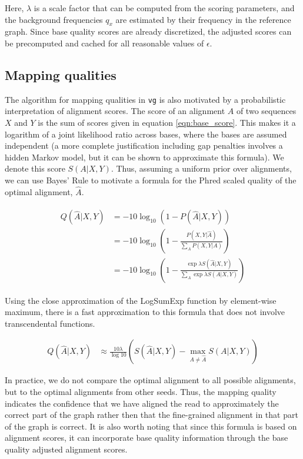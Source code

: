 Here, $\lambda$ is a scale factor that can be computed from the scoring parameters, and the background frequencies $q_x$ are estimated by their frequency in the reference graph. Since base quality scores are already discretized, the adjusted scores can be precomputed and cached for all reasonable values of $\epsilon$. 

\subsection{Mapping qualities}

The algorithm for mapping qualities in {\tt vg} is also motivated by a probabilistic interpretation of alignment scores.
The score of an alignment $A$ of two sequences $X$ and $Y$ is the sum of scores given in equation \ref{eqn:base_score}.
This makes it a logarithm of a joint likelihood ratio across bases, where the bases are assumed independent (a more complete justification including gap penalties involves a hidden Markov model, but it can be shown to approximate this formula).
We denote this score $S(A|X,Y)$.
Thus, assuming a uniform prior over alignments, we can use Bayes' Rule to motivate a formula for the Phred scaled quality of the optimal alignment, $\hat A$.

\begin{align}
\begin{split}
    Q(\hat A|X,Y) &= -10\log_{10}(1 - P(\hat A|X,Y)) \\
    &= -10 \log_{10}\left(1 - \frac{P(X,Y|\hat A)}{\sum_{A}P(X,Y|A)} \right) \\
    &= -10 \log_{10}\left(1 - \frac{\exp \lambda S(\hat A|X,Y)}{\sum_{A}\exp \lambda S(A|X,Y)} \right) \label{basicqualityscore}
\end{split}
\end{align}

Using the close approximation of the LogSumExp function by element-wise maximum, there is a fast approximation to this formula that does not involve transcendental functions.

\begin{align}
    Q(\hat A|X,Y) &\approx \frac{10\lambda}{\log 10}\left( S(\hat A | X,Y) - \max_{A \neq \hat A}S(A| X,Y)\right)
\end{align}

In practice, we do not compare the optimal alignment to all possible alignments, but to the optimal alignments from other seeds. Thus, the mapping quality indicates the confidence that we have aligned the read to approximately the correct part of the graph rather then that the fine-grained alignment in that part of the graph is correct. It is also worth noting that since this formula is based on alignment scores, it can incorporate base quality information through the base quality adjusted alignment scores.



